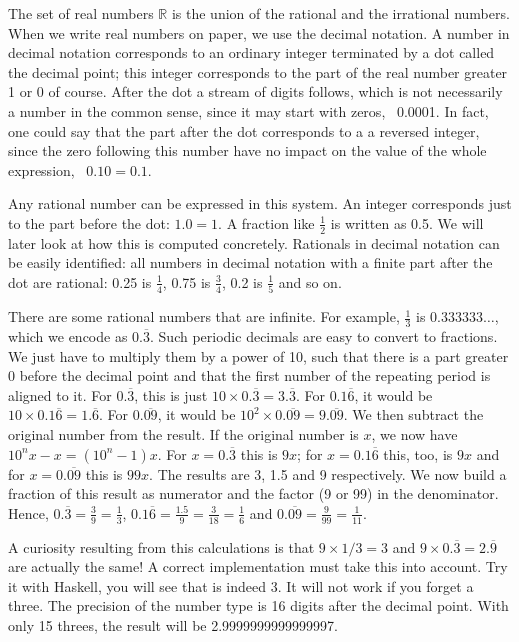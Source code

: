 \documentclass[tikz]{scrreprt}
\newcommand{\texfamily}{\fontfamily{cmtex}\selectfont}
\begin{document}
The set of real numbers $\mathbb{R}$ is
the union of the rational and the irrational numbers.
When we write real numbers on paper,
we use the decimal notation.
A number in decimal notation corresponds to 
an ordinary integer terminated by a dot
called the decimal point;
this integer corresponds to the part of the real number
greater 1 or 0 of course.
After the dot a stream of digits follows,
which is not necessarily a number in the common sense,
since it may start with zeros, \eg\ 0.0001.
In fact, one could say that the part after the dot
corresponds to a a reversed integer,
since the zero following this number
have no impact on the value of the whole expression,
\ie\ $0.10 = 0.1$.

Any rational number can be expressed in this system.
An integer corresponds just to the part before the dot:
$1.0 = 1$. A fraction like $\frac{1}{2}$ is written
as 0.5. We will later look at 
how this is computed concretely.
Rationals in decimal notation can be easily identified:
all numbers in decimal notation with a finite part
after the dot are rational: 
0.25 is $\frac{1}{4}$,
0.75 is $\frac{3}{4}$,
0.2  is $\frac{1}{5}$ and so on.

There are some rational numbers that are infinite.
For example, $\frac{1}{3}$ is $0.333333\dots$,
which we encode as $0.\overline{3}$.
Such periodic decimals are easy to convert
to fractions. We just have to multiply them
by a power of 10, such that there is a part
greater 0 before the decimal point and
that the first number
of the repeating period is aligned to it.
For $0.\overline{3}$, 
this is just $10\times 0.\overline{3} = 3.\overline{3}$.
For $0.1\overline{6}$,
it would be $10\times 0.1\overline{6} = 1.\overline{6}$.
For $0.\overline{09}$,
it would be $10^2\times 0.\overline{09} = 9.\overline{09}$.
We then subtract the original number from the result.
If the original number is $x$, we now have 
$10^nx - x = (10^n-1)x$.
For $x=0.\overline{3}$ this is $9x$;
for $x=0.1\overline{6}$ this, too, is $9x$ and
for $x=0.\overline{09}$ this is $99x$.
The results are 3, 1.5 and 9 respectively.
We now build a fraction of this result as numerator
and the factor (9 or 99) in the denominator.
Hence, $0.\overline{3} = \frac{3}{9} = \frac{1}{3}$,
$0.1\overline{6} = \frac{1.5}{9} = \frac{3}{18} = \frac{1}{6}$ and
$0.\overline{09} = \frac{9}{99} = \frac{1}{11}$.

A curiosity resulting from this calculations
is that $9\times 1/3 = 3$ and 
$9 \times 0.\overline{3} = 2.\overline{9}$
are actually the same! A correct implementation
must take this into account.
Try it with Haskell, you will see that
\text{\texfamily 9*0.3333333333333333} is indeed 3.
It will not work if you forget a three.
The precision of the \text{\texfamily {\itshape Double}} number type is 16
digits after the decimal point. With only 15 threes,
the result will be 2.9999999999999997.
\end{document}
